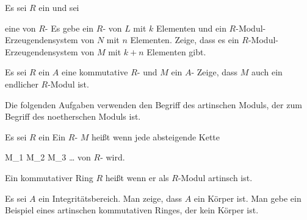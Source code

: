 {}
{





Es sei $R$ ein
und sei

 {  }

eine
von
$R$-
Es gebe ein
$R$-
von $L$ mit $k$ Elementen und ein $R$-Modul-Erzeugendensystem von $N$ mit $n$ Elementen. Zeige, dass es ein $R$-Modul-Erzeugendensystem von $M$ mit $k+n$ Elementen gibt.





}
{} {}

{}
{





Es sei $R$ ein
$A$ eine kommutative
$R$-
und $M$ ein
$A$-
Zeige, dass $M$ auch ein endlicher $R$-Modul ist.





}
{} {}

Die folgenden Aufgaben verwenden den Begriff des artinschen Moduls, der  zum Begriff des noetherschen Moduls ist.





Es sei $R$ ein
Ein
$R$-
$M$ heißt  wenn jede
absteigende Kette

\mavergleichskettedisp
{\vergleichskette
{ M_1
}
{ \supseteq} { M_2
}
{ \supseteq} { M_3
}
{ \supseteq} { \ldots
}
{ } {
}
}
{}{}{}
von
$R$-
wird.






Ein kommutativer Ring $R$ heißt
 wenn er als $R$-Modul artinsch ist.

{}
{





Es sei $A$ ein
Integritätsbereich. Man zeige, dass $A$ ein Körper ist. Man gebe ein Beispiel eines artinschen kommutativen Ringes, der kein Körper ist.





}
{} {}

